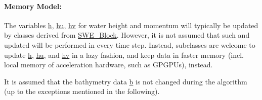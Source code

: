 \paragraph*{Memory Model\-:}

The variables \hyperlink{classSWE__Block_a64a0f8f437f38b5f3b8ec5b4abdb864e}{h}, \hyperlink{classSWE__Block_aec2c1278fdb23f083216d8d397f26060}{hu}, \hyperlink{classSWE__Block_a0897aa3c2d78749f209c95e08196d831}{hv} for water height and momentum will typically be updated by classes derived from \hyperlink{classSWE__Block}{S\-W\-E\-\_\-\-Block}. However, it is not assumed that such and updated will be performed in every time step. Instead, subclasses are welcome to update \hyperlink{classSWE__Block_a64a0f8f437f38b5f3b8ec5b4abdb864e}{h}, \hyperlink{classSWE__Block_aec2c1278fdb23f083216d8d397f26060}{hu}, and \hyperlink{classSWE__Block_a0897aa3c2d78749f209c95e08196d831}{hv} in a lazy fashion, and keep data in faster memory (incl. local memory of acceleration hardware, such as G\-P\-G\-P\-Us), instead.

It is assumed that the bathymetry data \hyperlink{classSWE__Block_af7487209129f40b26ea171762754a261}{b} is not changed during the algorithm (up to the exceptions mentioned in the following).


